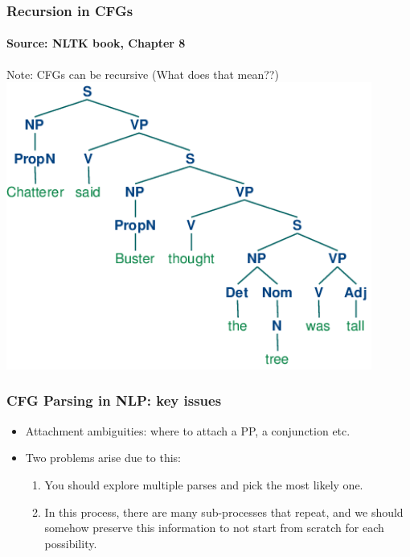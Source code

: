 \documentclass{beamer}
\begin{document}
\begin{frame}
\frametitle{Recursion in CFGs}
\framesubtitle{Source: NLTK book, Chapter 8}
Note: CFGs can be recursive (What does that mean??) \\
\pause \includegraphics[width=0.9\textwidth]{nltk-tree-example.png}
\end{frame}

\begin{frame}
\frametitle{CFG Parsing in NLP: key issues}
\begin{itemize}
\item Attachment ambiguities: where to attach a PP, a conjunction etc. 
\item Two problems arise due to this:
\begin{enumerate}
\item You should explore multiple parses and pick the most likely one. 
\item In this process, there are many sub-processes that repeat, and we should somehow preserve this information to not start from scratch for each possibility.
\end{enumerate}
\end{itemize}
\end{frame}
\end{document}
